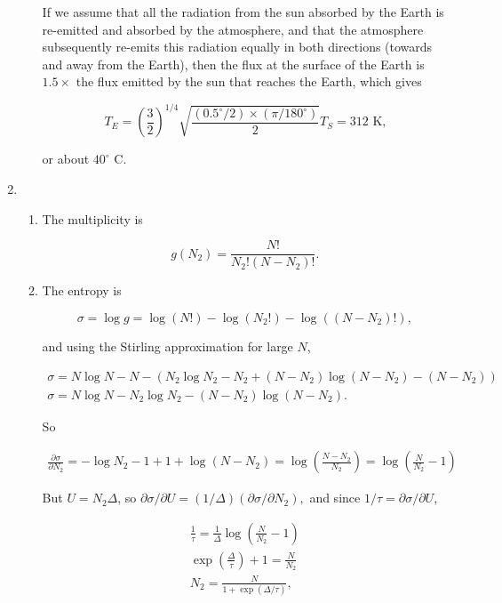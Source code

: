 \documentclass{article}
\begin{document}
\begin{enumerate}
\begin{enumerate}[(a)]
		If we assume that all the radiation from the sun absorbed by the Earth is re-emitted and absorbed by the atmosphere, and that the atmosphere subsequently re-emits this radiation equally in both directions (towards and away from the Earth), then the flux at the surface of the Earth is $1.5 \times$ the flux emitted by the sun that reaches the Earth, which gives

		$$T_E = \left( \frac{3}{2} \right)^{1/4} \sqrt{\frac{(0.5^\circ / 2) \times (\pi / 180^\circ)}{2}} T_S = 312 \text{ K,}$$

		or about $40^\circ$ C. 

	\end{enumerate}

	\item

	\begin{enumerate}

		\item

		The multiplicity is

		$$g(N_2) = \frac{N!}{N_2! (N-N_2)!}.$$

		\item

		The entropy is

		$$\sigma = \log g = \log (N!) - \log (N_2!) - \log((N-N_2)!),$$

		and using the Stirling approximation for large $N$,

		\begin{gather*}
		\sigma = N \log N - N - (N_2 \log N_2 - N_2 + (N-N_2) \log(N-N_2) - (N-N_2)) \\
		\sigma = N\log N - N_2 \log N_2 - (N-N_2)\log(N-N_2).
		\end{gather*}

		So

		\begin{gather*}
		\frac{\partial \sigma}{\partial N_2} = - \log N_2 - 1 + 1 + \log(N-N_2) = \log \left( \frac{N-N_2}{N_2} \right) = \log\left( \frac{N}{N_2} - 1 \right)
		\end{gather*}

		But $U = N_2\Delta$, so $\partial \sigma / \partial U = (1/\Delta) (\partial \sigma / \partial N_2),$ and since $1/\tau = \partial \sigma / \partial U$, 

		\begin{gather*}
		\frac{1}{\tau} = \frac{1}{\Delta} \log\left( \frac{N}{N_2} - 1 \right) \\
		\exp{\left(\frac{\Delta}{\tau} \right)} + 1 = \frac{N}{N_2} \\
		N_2 = \frac{N}{1 + \exp(\Delta/\tau)},
		\end{gather*}


\end{enumerate}
\end{enumerate}
\end{document}
